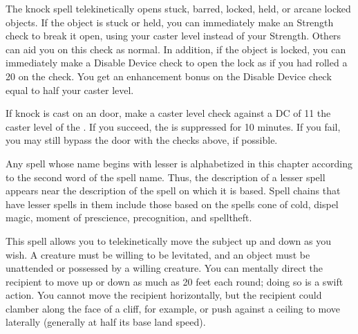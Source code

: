 \begin{comment}
\subsubsection{J-L}
\end{comment}

\spellrng{\rngclose}
\begin{spelleffect}
  The knock spell telekinetically opens stuck, barred, locked, held, or arcane locked objects. If the object is stuck or held, you can immediately make an Strength check to break it open, using your caster level instead of your Strength. Others can aid you on this check as normal. In addition, if the object is locked, you can immediately make a Disable Device check to open the lock as if you had rolled a 20 on the check. You get an enhancement bonus on the Disable Device check equal to half your caster level.
\end{spelleffect}
\begin{spellnotes}
  If knock is cast on an  door, make a caster level check against a DC of 11 \add the caster level of the . If you succeed, the  is suppressed for 10 minutes. If you fail, you may still bypass the door with the checks above, if possible.
\end{spellnotes}

\par Any spell whose name begins with lesser is alphabetized in this chapter according to the second word of the spell name. Thus, the description of a lesser spell appears near the description of the spell on which it is based. Spell chains that have lesser spells in them include those based on the spells cone of cold, dispel magic, moment of prescience, precognition, and spelltheft.

\spellrng{\rngclose}
\begin{spelleffect}
  This spell allows you to telekinetically move the subject up and down as you wish. A creature must be willing to be levitated, and an object must be unattended or possessed by a willing creature. You can mentally direct the recipient to move up or down as much as 20 feet each round; doing so is a swift action. You cannot move the recipient horizontally, but the recipient could clamber along the face of a cliff, for example, or push against a ceiling to move laterally (generally at half its base land speed).
\end{spelleffect}

